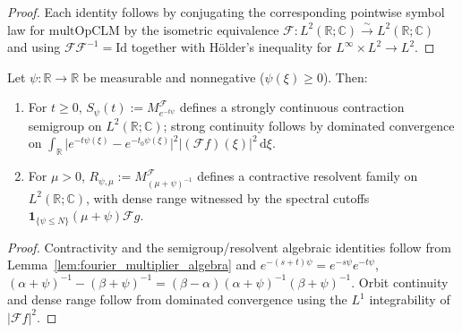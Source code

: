 \begin{proof}
\leanok
Each identity follows by conjugating the corresponding pointwise symbol law for $\mathrm{multOpCLM}$ by the isometric equivalence $\mathcal{F} : L^2(\mathbb{R}; \mathbb{C}) \xrightarrow{\sim} L^2(\mathbb{R}; \mathbb{C})$ and using $\mathcal{F}\mathcal{F}^{-1} = \mathrm{Id}$ together with Hölder's inequality for $L^\infty \times L^2 \to L^2$.
\end{proof}

\begin{theorem}\label{thm:fourier_multiplier_semigroup_resolvent}
\leanok
Let $\psi : \mathbb{R} \to \mathbb{R}$ be measurable and nonnegative ($\psi(\xi) \ge 0$). Then:
\begin{enumerate}
  \item For $t \ge 0$, $S_\psi(t) := M_{e^{-t \psi}}^{\mathcal{F}}$ defines a strongly continuous contraction semigroup on $L^2(\mathbb{R}; \mathbb{C})$; strong continuity follows by dominated convergence on $\int_{\mathbb{R}} \lvert e^{-t\psi(\xi)} - e^{-t_0 \psi(\xi)} \rvert^2 \lvert (\mathcal{F}f)(\xi) \rvert^2 \, \mathrm{d}\xi$.
  \item For $\mu > 0$, $R_{\psi, \mu} := M_{(\mu + \psi)^{-1}}^{\mathcal{F}}$ defines a contractive resolvent family on $L^2(\mathbb{R}; \mathbb{C})$, with dense range witnessed by the spectral cutoffs $\mathbf{1}_{\{\psi \le N\}} (\mu + \psi) \mathcal{F} g$.
\end{enumerate}
\end{theorem}

\begin{proof}
\leanok
Contractivity and the semigroup/resolvent algebraic identities follow from Lemma~\ref{lem:fourier_multiplier_algebra} and $e^{-(s+t)\psi} = e^{-s\psi} e^{-t\psi}$, $(\alpha + \psi)^{-1} - (\beta + \psi)^{-1} = (\beta - \alpha)(\alpha + \psi)^{-1}(\beta + \psi)^{-1}$. Orbit continuity and dense range follow from dominated convergence using the $L^1$ integrability of $\lvert \mathcal{F}f \rvert^2$.
\end{proof}


